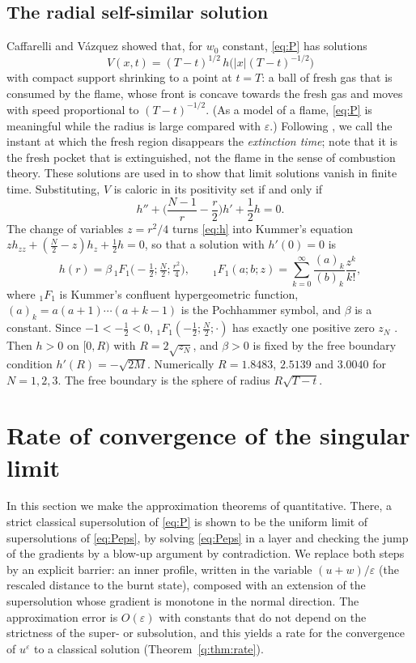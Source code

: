 \documentclass[11pt]{amsart}
\theoremstyle{definition}
\theoremstyle{remark}
\newcommand{\ve}{\varepsilon}
\begin{document}
\subsection{The radial self-similar solution}\label{sec:selfsimilar}
Caffarelli and V\'azquez \cite{CaffarelliVazquez1995} showed that, for $w_0$ constant,
\eqref{eq:P} has solutions
\[
V(x,t)=(T-t)^{1/2}\,h\big(|x|(T-t)^{-1/2}\big)
\]
with compact support shrinking to a point at $t=T$: a ball of fresh gas that is consumed
by the flame, whose front is concave towards the fresh gas and moves with speed
proportional to $(T-t)^{-1/2}$. (As a model of a flame, \eqref{eq:P} is meaningful while
the radius is large compared with $\ve$.) Following
\cite{GalaktionovHulshofVazquez1997,Petrosyan2002}, we call the instant at
which the fresh region disappears the \emph{extinction time}; note that it is the fresh
pocket that is extinguished, not the flame in the sense of combustion theory. These
solutions are used in
\cite[Prop.~4.3]{FernandezBonderWolanski2004} to show that limit solutions vanish in
finite time. Substituting, $V$ is caloric in its positivity set if and only if
\begin{equation}\label{eq:h}
h''+\Big(\frac{N-1}r-\frac r2\Big)h'+\frac12h=0.
\end{equation}
The change of
variables $z=r^2/4$ turns \eqref{eq:h} into Kummer's equation
$zh_{zz}+(\frac N2-z)h_z+\frac12h=0$, so that a solution with $h'(0)=0$ is
\[
h(r)=\beta\,{}_1F_1\big(-\tfrac12;\tfrac N2;\tfrac{r^2}4\big),
\qquad
{}_1F_1(a;b;z)=\sum_{k=0}^\infty\frac{(a)_k}{(b)_k}\frac{z^k}{k!},
\]
where ${}_1F_1$ is Kummer's confluent hypergeometric function,
$(a)_k=a(a+1)\cdots(a+k-1)$ is the Pochhammer symbol, and $\beta$ is a constant. Since $-1<-\frac12<0$, ${}_1F_1(-\frac12;\frac N2;\cdot)$ has exactly one
positive zero $z_N$ \cite[\S13.9]{DLMF}. Then $h>0$ on $[0,R)$ with $R=2\sqrt{z_N}$, and
$\beta>0$ is fixed by the free boundary condition $h'(R)=-\sqrt{2M}$. Numerically
$R=1.8483$, $2.5139$ and $3.0040$ for $N=1,2,3$. The free boundary is the sphere of
radius $R\sqrt{T-t}$.

\section{Rate of convergence of the singular limit}\label{sec:rate}

In this section we make the approximation theorems of
\cite[Theorems~4.1--4.2]{FernandezBonderWolanski2004} quantitative. There, a
strict classical supersolution of \eqref{eq:P} is shown to be the uniform limit
of supersolutions of \eqref{eq:Peps}, by solving \eqref{eq:Peps} in a layer
and checking the jump of the gradients by a blow-up argument by contradiction.
We replace both steps by an explicit barrier: an inner profile, written in the
variable $(u+w)/\ve$ (the rescaled distance to the burnt state), composed with
an extension of the supersolution whose gradient is monotone in the normal
direction. The approximation error is $O(\ve)$ with constants that do not
depend on the strictness of the super- or subsolution, and this yields a rate
for the convergence of $u^\ve$ to a classical solution
(Theorem~\ref{q:thm:rate}).
\end{document}
